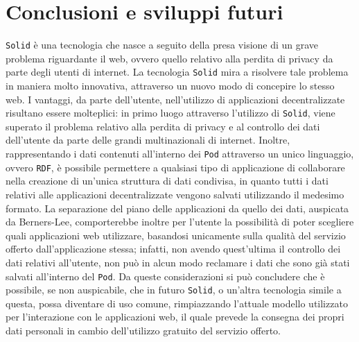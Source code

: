 
\chapter{Conclusioni e sviluppi futuri}

\medskip

{\tt Solid} è una tecnologia che nasce a seguito della presa visione di un grave problema riguardante il web, ovvero quello relativo alla perdita di privacy da parte degli utenti di internet. La tecnologia {\tt Solid} mira a risolvere tale problema in maniera molto innovativa, attraverso un nuovo modo di concepire lo stesso web. I vantaggi, da parte dell'utente, nell'utilizzo di applicazioni decentralizzate risultano essere molteplici: in primo luogo attraverso l'utilizzo di {\tt Solid}, viene superato il problema relativo alla perdita di privacy e al controllo dei dati dell'utente da parte delle grandi multinazionali di internet. Inoltre, rappresentando i dati contenuti all'interno dei {\tt Pod} attraverso un unico linguaggio, ovvero {\tt RDF}, è possibile permettere a qualsiasi tipo di applicazione di collaborare nella creazione di un'unica struttura di dati condivisa, in quanto tutti i dati relativi alle applicazioni decentralizzate vengono salvati utilizzando il medesimo formato. La separazione del piano delle applicazioni da quello dei dati, auspicata da Berners-Lee, comporterebbe inoltre per l'utente la possibilità di poter scegliere quali applicazioni web utilizzare, basandosi unicamente sulla qualità del servizio offerto dall'applicazione stessa; infatti, non avendo quest'ultima il controllo dei dati relativi all'utente, non può in alcun modo reclamare i dati che sono già stati salvati all'interno del {\tt Pod}. Da queste considerazioni si può concludere che è possibile, se non auspicabile, che in futuro {\tt Solid}, o un'altra tecnologia simile a questa, possa diventare di uso comune, rimpiazzando l'attuale modello utilizzato per l'interazione con le applicazioni web, il quale prevede la consegna dei propri dati personali in cambio dell'utilizzo gratuito del servizio offerto.

\bigskip

